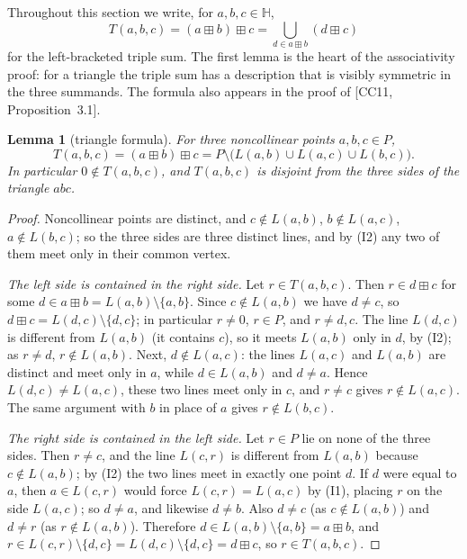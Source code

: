 \documentclass[11pt]{article}
\theoremstyle{plain}
\newtheorem{lemma}[theorem]{Lemma}
\theoremstyle{definition}
\newcommand{\Hh}{\mathbb{H}}
\newcommand{\bp}{\boxplus}
\begin{document}
Throughout this section we write, for $a,b,c\in\Hh$,
\[
 T(a,b,c)=(a\bp b)\bp c=\bigcup_{d\in a\bp b}(d\bp c)
\]
for the left-bracketed triple sum.  The first lemma is the heart of the
associativity proof: for a triangle the triple sum has a description
that is visibly symmetric in the three summands.  The formula also
appears in the proof of [CC11, Proposition~3.1].

\begin{lemma}[triangle formula]\label{lem:triangle}
For three noncollinear points $a,b,c\in P$,
\begin{equation}\label{eq:triangle}
 T(a,b,c)=(a\bp b)\bp c
 =P\setminus\bigl(L(a,b)\cup L(a,c)\cup L(b,c)\bigr).
\end{equation}
In particular $0\notin T(a,b,c)$, and $T(a,b,c)$ is disjoint from the
three sides of the triangle $abc$.
\end{lemma}
\begin{proof}
Noncollinear points are distinct, and $c\notin L(a,b)$,
$b\notin L(a,c)$, $a\notin L(b,c)$; so the three sides are three distinct
lines, and by (I2) any two of them meet only in their common vertex.

\emph{The left side is contained in the right side.}
Let $r\in T(a,b,c)$.  Then $r\in d\bp c$ for some
$d\in a\bp b=L(a,b)\setminus\{a,b\}$.  Since $c\notin L(a,b)$ we have
$d\neq c$, so $d\bp c=L(d,c)\setminus\{d,c\}$; in particular $r\neq0$,
$r\in P$, and $r\neq d,c$.  The line $L(d,c)$ is different from
$L(a,b)$ (it contains $c$), so it meets $L(a,b)$ only in $d$, by (I2);
as $r\neq d$, $r\notin L(a,b)$.  Next, $d\notin L(a,c)$: the lines
$L(a,c)$ and $L(a,b)$ are distinct and meet only in $a$, while
$d\in L(a,b)$ and $d\neq a$.  Hence $L(d,c)\neq L(a,c)$, these two
lines meet only in $c$, and $r\neq c$ gives $r\notin L(a,c)$.  The same
argument with $b$ in place of $a$ gives $r\notin L(b,c)$.

\emph{The right side is contained in the left side.}
Let $r\in P$ lie on none of the three sides.  Then $r\neq c$, and the
line $L(c,r)$ is different from $L(a,b)$ because $c\notin L(a,b)$; by
(I2) the two lines meet in exactly one point $d$.  If $d$ were equal to
$a$, then $a\in L(c,r)$ would force $L(c,r)=L(a,c)$ by (I1), placing
$r$ on the side $L(a,c)$; so $d\neq a$, and likewise $d\neq b$.  Also
$d\neq c$ (as $c\notin L(a,b)$) and $d\neq r$ (as $r\notin L(a,b)$).
Therefore $d\in L(a,b)\setminus\{a,b\}=a\bp b$, and
$r\in L(c,r)\setminus\{d,c\}=L(d,c)\setminus\{d,c\}=d\bp c$, so
$r\in T(a,b,c)$.
\end{proof}
\end{document}
